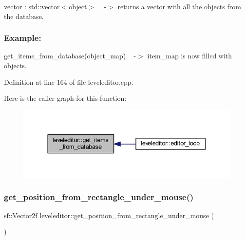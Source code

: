 vector \+: std\+::vector$<$object$>$ ~\newline
-\/$>$ returns a vector with all the objects from the database.

\subsubsection*{Example\+: }

get\+\_\+items\+\_\+from\+\_\+database(object\+\_\+map) ~\newline
-\/$>$ item\+\_\+map is now filled with objects. 

Definition at line 164 of file leveleditor.\+cpp.

Here is the caller graph for this function\+:
\nopagebreak
\begin{figure}[H]
\begin{center}
\leavevmode
\includegraphics[width=337pt]{classleveleditor_ace9678fd4d5cdce53584dcc55d4e7c7b_icgraph}
\end{center}
\end{figure}
\mbox{\label{classleveleditor_ac6bf4571731b8283feb4c20d1391fa8b}} 
\subsubsection{\texorpdfstring{get\+\_\+position\+\_\+from\+\_\+rectangle\+\_\+under\+\_\+mouse()}{get\_position\_from\_rectangle\_under\_mouse()}}
{\footnotesize\ttfamily sf\+::\+Vector2f leveleditor\+::get\+\_\+position\+\_\+from\+\_\+rectangle\+\_\+under\+\_\+mouse (\begin{DoxyParamCaption}{ }\end{DoxyParamCaption})\hspace{0.3cm}{\ttfamily [private]}}



